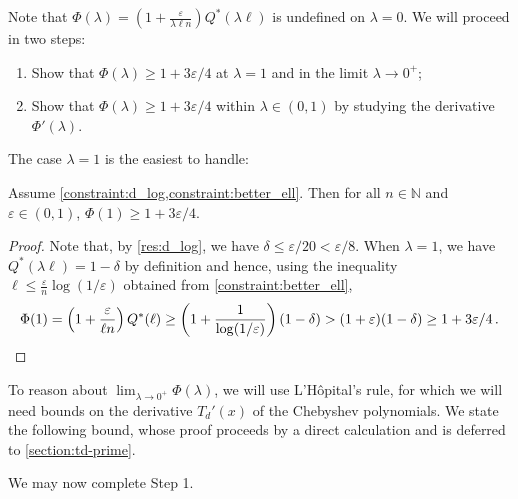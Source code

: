 \documentclass{theoretics}
\makeatletter
\newcommand\IfRestateTF{%
  \ifx\label\thmt@gobble@label %
    \expandafter\@firstoftwo
  \else
    \expandafter\@secondoftwo
  \fi
}
\newcommand{\RestateRemark}{\IfRestateTF{{\normalfont\bfseries (Restated) }}{}}
\newcommand{\bN}{\ensuremath{\mathbb{N}}}
\renewcommand{\epsilon}{\varepsilon}
\makeatother
\begin{document}
Note that $\Phi(\lambda) = \left(1 + \frac{\epsilon}{\lambda \ell n}\right) Q^*(\lambda \ell)$ is
undefined on $\lambda = 0$. We will proceed in two steps:
\begin{enumerate}
\item Show that $\Phi(\lambda) \ge 1+3\epsilon/4$ at $\lambda = 1$ and in the limit $\lambda \to
    0^+$;
\item Show that $\Phi(\lambda) \ge 1+3\epsilon/4$ within $\lambda \in (0,1)$ by studying the
    derivative $\Phi'(\lambda)$.
\end{enumerate}

The case $\lambda = 1$ is the easiest to handle:

\begin{proposition}
    \label{res:phi-at-1}
    Assume \cref{constraint:d_log,constraint:better_ell}. Then for all $n \in \bN$ and $\epsilon \in
    (0, 1)$, $\Phi(1) \ge 1 + 3\epsilon/4$.
\end{proposition}
\begin{proof}
    Note that, by \cref{res:d_log}, we have $\delta \le \epsilon/20 < \epsilon/8$. When $\lambda =
    1$, we have $Q^*(\lambda \ell) = 1-\delta$ by definition and hence, using the inequality $\ell
    \le \tfrac{\epsilon}{n} \log(1/\epsilon)$ obtained from \cref{constraint:better_ell},
    \[
        \Phi(1)
        = \left(1 + \frac{\epsilon}{\ell n}\right) Q^*(\ell)
        \ge \left(1 + \frac{1}{\log(1/\epsilon)}\right) (1-\delta)
        > (1 + \epsilon) (1-\delta)
        \ge 1 + 3\epsilon/4 \,. \qedhere
    \]
\end{proof}

To reason about $\lim_{\lambda \to 0^+} \Phi(\lambda)$, we will use L'Hôpital's rule, for which we
will need bounds on the derivative $T_d'(x)$ of the Chebyshev polynomials. We state the following
bound, whose proof proceeds by a direct calculation and is deferred to \cref{section:td-prime}.


We may now complete Step 1.
\end{document}
